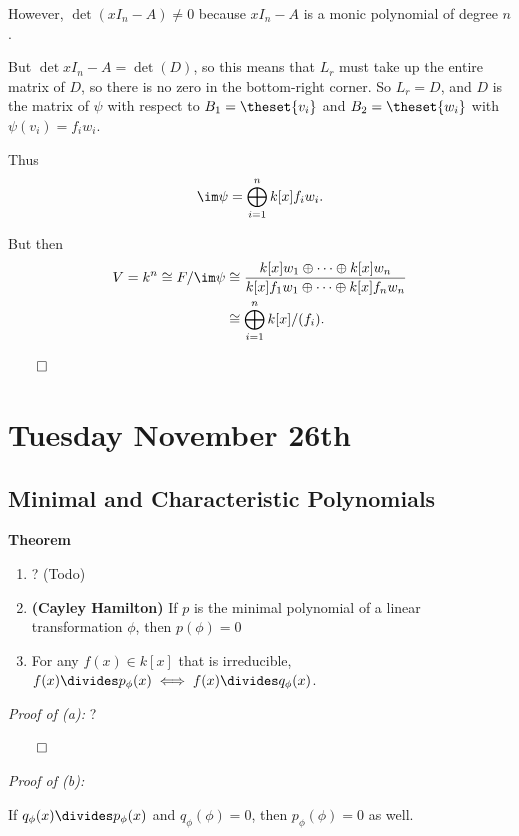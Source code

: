 However, \(\det(xI_n - A) \neq 0\) because \(x I_n - A\) is a monic
polynomial of degree \(n\).

But \(\det{xI_n - A} = \det(D)\), so this means that \(L_r\) must take
up the entire matrix of \(D\), so there is no zero in the bottom-right
corner. So \(L_r = D\), and \(D\) is the matrix of \(\psi\) with respect
to \(B_1 = \theset{v_i}\) and \(B_2 = \theset{w_i}\) with
\(\psi(v_i) = f_i w_i\).

Thus
\begin{align*}
\im \psi = \bigoplus_{i=1}^n k[x] f_i w_i.
\end{align*}

But then \begin{align*}
V = k^n \cong F/ \im \psi
&\cong \frac{k[x] w_1 \oplus \cdots \oplus k[x] w_n} {k[x] f_1 w_1 \oplus \cdots \oplus k[x] f_n w_n} \\
&\cong \bigoplus_{i=1}^n k[x]/(f_i)
.\end{align*}

\(\qed\)

\hypertarget{tuesday-november-26th}{%
\section{Tuesday November 26th}\label{tuesday-november-26th}}

\hypertarget{minimal-and-characteristic-polynomials}{%
\subsection{Minimal and Characteristic
Polynomials}\label{minimal-and-characteristic-polynomials}}

\textbf{Theorem}

\begin{enumerate}
\def\labelenumi{\alph{enumi}.}
\item
  ? (Todo)
\item
  \textbf{(Cayley Hamilton)} If \(p\) is the minimal polynomial of a
  linear transformation \(\phi\), then \(p(\phi) = 0\)
\item
  For any \(f(x) \in k[x]\) that is irreducible,
  \(f(x) \divides p_\phi(x) \iff f(x) \divides q_\phi(x)\).
\end{enumerate}

\emph{Proof of (a):} ?

\(\qed\)

\emph{Proof of (b):}

If \(q_\phi(x) \divides p_\phi(x)\) and \(q_\phi(\phi) = 0\), then
\(p_\phi(\phi) = 0\) as well.

